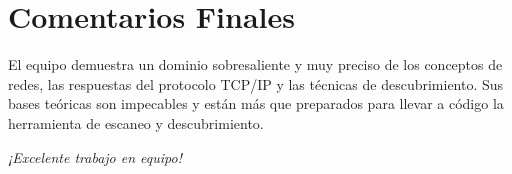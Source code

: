 \documentclass[12pt,a4paper]{article}
\begin{document}
\vspace{1cm}

\section*{Comentarios Finales}
\noindent El equipo demuestra un dominio sobresaliente y muy preciso de los conceptos de redes, las respuestas del protocolo TCP/IP y las técnicas de descubrimiento. Sus bases teóricas son impecables y están más que preparados para llevar a código la herramienta de escaneo y descubrimiento.

\vspace{0.5cm}
\begin{center}
    \textit{¡Excelente trabajo en equipo!}
\end{center}
\end{document}
